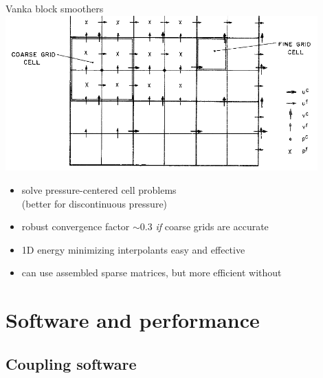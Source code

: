 \documentclass{beamer}
\begin{document}
\begin{frame}{Vanka block smoothers}
  \includegraphics[width=0.9\textwidth]{figures/VankaStaggeredGrid} \\
  \begin{itemize}
  \item solve pressure-centered cell problems \\
    \quad (better for discontinuous pressure)
  \item robust convergence factor $\sim 0.3$ \emph{if} coarse grids are accurate
  \item 1D energy minimizing interpolants easy and effective
  \item can use assembled sparse matrices, but more efficient without
  \end{itemize}
\end{frame}



\section{Software and performance}
\subsection{Coupling software}




% 
% 

% 
% 


% 
% 

% 
% 
\end{document}
